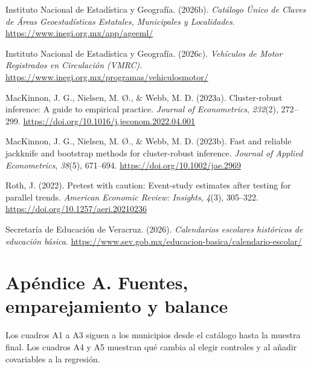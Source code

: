 \documentclass[11pt,letterpaper]{article}
\begin{document}
\par\hangindent=0.5in\noindent Instituto Nacional de Estadística y Geografía. (2026b). \emph{Catálogo Único de Claves de Áreas Geoestadísticas Estatales, Municipales y Localidades}. \url{https://www.inegi.org.mx/app/ageeml/}\par

\par\hangindent=0.5in\noindent Instituto Nacional de Estadística y Geografía. (2026c). \emph{Vehículos de Motor Registrados en Circulación (VMRC)}. \url{https://www.inegi.org.mx/programas/vehiculosmotor/}\par

\par\hangindent=0.5in\noindent MacKinnon, J. G., Nielsen, M. Ø., \& Webb, M. D. (2023a). Cluster-robust inference: A guide to empirical practice. \emph{Journal of Econometrics}, \emph{232}(2), 272--299. \url{https://doi.org/10.1016/j.jeconom.2022.04.001}\par

\par\hangindent=0.5in\noindent MacKinnon, J. G., Nielsen, M. Ø., \& Webb, M. D. (2023b). Fast and reliable jackknife and bootstrap methods for cluster-robust inference. \emph{Journal of Applied Econometrics}, \emph{38}(5), 671--694. \url{https://doi.org/10.1002/jae.2969}\par

\par\hangindent=0.5in\noindent Roth, J. (2022). Pretest with caution: Event-study estimates after testing for parallel trends. \emph{American Economic Review: Insights}, \emph{4}(3), 305--322. \url{https://doi.org/10.1257/aeri.20210236}\par

\par\hangindent=0.5in\noindent Secretaría de Educación de Veracruz. (2026). \emph{Calendarios escolares históricos de educación básica}. \url{https://www.sev.gob.mx/educacion-basica/calendario-escolar/}\par

\endgroup

\clearpage

\section*{Apéndice A. Fuentes, emparejamiento y balance}

Los cuadros A1 a A3 siguen a los municipios desde el catálogo hasta la muestra final. Los cuadros A4 y A5 muestran qué cambia al elegir controles y al añadir covariables a la regresión.\par
\end{document}
